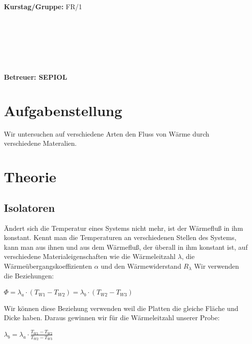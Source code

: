 \documentclass[12pt,a4paper,twopage]{article}
\begin{document}
\begin{verbatim}


\end{verbatim}
			\begin{flushleft}
			\textbf{\Large{Kurstag/Gruppe:}} \Large{FR/1}
			\end{flushleft}

\begin{verbatim}






\end{verbatim}
			\begin{flushleft}
			\LARGE{\textbf{Betreuer:\Large{ SEPIOL }}}		
			\end{flushleft}
			
\section{Aufgabenstellung}
Wir untersuchen auf verschiedene Arten den Fluss von Wärme durch verschiedene Materalien.
\section{Theorie}
\subsection{Isolatoren}
Ändert sich die Temperatur eines Systems nicht mehr, ist der Wärmefluß in ihm konstant. Kennt man die Temperaturen an verschiedenen Stellen des Systems, kann man aus ihnen und aus dem Wärmefluß, der überall in ihm konstant ist, auf verschiedene Materialeigenschaften wie die Wärmeleitzahl $\lambda$, die Wärmeübergangskoeffizienten $\alpha$ und den Wärmewiderstand $R_\lambda$
Wir verwenden die Beziehungen:

\( \Phi = \lambda_a \cdot (T_{W1}-T_{W2})= \lambda_b \cdot (T_{W2}-T_{W3}) \)

Wir können diese Beziehung verwenden weil die Platten die gleiche Fläche und Dicke haben. Daraus gewinnen wir für die Wärmeleitzahl unserer Probe:

\( \lambda_b = \lambda_a \cdot \frac{T_{W1}-T_{W2}}{T_{W2}-T_{W3}} \)
\end{document}
